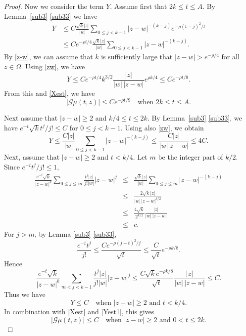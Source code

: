 \documentclass[11pt]{amsart}
\theoremstyle{definition}
\theoremstyle{remark}
\numberwithin{equation}{section}
\begin{document}
\begin{proof}
Now we consider the term $Y$.   Assume first that $2k \le t \le A$.  By Lemma~\ref{sub3} \eqref{sub33} we have
\begin{align*}
Y &\le C \frac{\sqrt{k} |z|}{|w|} \sum_{0 \le j < k-1} |z-w|^{-(k-j)} e^{-\rho(t-j)^2/t} \\
&\le C  e^{-\rho t/4} \frac{\sqrt{k} |z|}{|w|} \sum_{0 \le j < k-1} |z-w|^{-(k-j)}.
\end{align*}
By \eqref{z-w}, we can assume that $k$ is sufficiently large that  $|z-w|> e^{-\rho/4}$ for all $z \in \Omega$.  Using \eqref{zw}, we have
$$
Y \le C e^{-\rho t/4} k^{3/2} \frac{|z|}{|w|\,|z-w|} e^{\rho k/4}  \le C e^{-\rho t/9}.
$$
 From this and \eqref{Xest}, we have
 \begin{equation}  \label{27a}
|\mathcal G\mu(t,z)|  \le Ce^{-\rho t/9} \quad \text{when $2k\le t \le A$}.
\end{equation}

Next assume that $|z-w|\ge 2$ and $ k/4 \le t \le 2k$.  By Lemma~\ref{sub3} \eqref{sub33},  we have $e^{-t} \sqrt{k} t^j/j! \le C$ for $0 \le j < k-1$.  Using also \eqref{zw}, we obtain
\begin{equation}\label{Yest1}
Y \le \frac{C |z|}{|w|} \sum_{0\le j < k-1} |z-w|^{-(k-j)} \le \frac{C |z|}{|w| |z-w|} \le 4C.
\end{equation}
Next, assume that $|z-w|\ge 2$ and $t< k/4$. Let $m$ be the integer part of $k/2$.  Since $e^{-t} t^j/j! \le 1$,
\begin{eqnarray*}
\frac{e^{-t}\sqrt{k}}{|z-w|^k}\sum_{0\le j \le m} \frac{t^j|z|}{j!|w|}|z-w|^j
&\le&
\frac{\sqrt{k}|z|}{|w|} \sum_{0\le j \le m} |z-w|^{-(k-j)} \\
&\le&
\frac{ 2\sqrt{k} |z|}{|w| \, |z-w|^{k/2}} \\
&\le&
\frac{ 4\sqrt{k}}{2^{k/2}} \frac{|z|}{|w| \, |z-w|} \\
&\le& c.
\end{eqnarray*}
For $j>m$, by Lemma \ref{sub3} \eqref{sub33},
$$
\frac{e^{-t}t^j}{j!}  \le \frac{Ce^{-\rho(j-t)^2/j}}{\sqrt{t}} \le \frac {C}{\sqrt{t}} e^{-\rho k /8}.
$$
Hence
$$
\frac{e^{-t}\sqrt{k}}{|z-w|^k}\sum_{m< j < k-1} \frac{t^j|z|}{j!|w|}|z-w|^j
\le
\frac{C \sqrt{k} e^{-\rho k /8}}{\sqrt{t}} \frac{|z|}{|w|\, |z-w|}  \le C.
$$
Thus we have
$$
Y \le C \quad \text{when $|z-w|\ge 2$ and $t< k/4$}.
$$
In combination with \eqref{Xest} and \eqref{Yest1}, this gives
\begin{equation}
|\mathcal G\mu(t,z)| \le C 
 \quad \text{when $|z-w|\ge2$ and $0< t \le 2k$}.\label{2u2}
\end{equation}


\end{proof}
\end{document}

